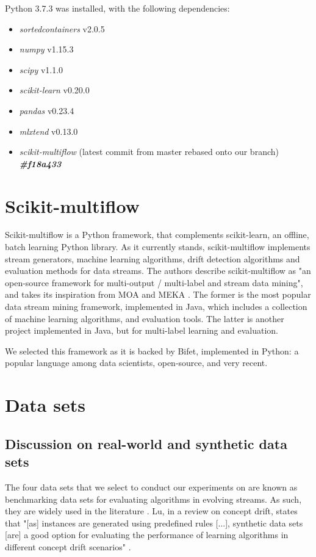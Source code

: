 Python 3.7.3 was installed, with the following dependencies:
\begin{itemize}
\item \textit{sortedcontainers} v2.0.5
\item \textit{numpy} v1.15.3
\item \textit{scipy} v1.1.0
\item \textit{scikit-learn} v0.20.0
\item \textit{pandas} v0.23.4
\item \textit{mlxtend} v0.13.0
\item \textit{scikit-multiflow} (latest commit from master rebased onto our branch) \textit{\textbf{\#f18a433}}
\end{itemize}

\section{Scikit-multiflow}
Scikit-multiflow \cite{skmultiflow} is a Python framework, that complements scikit-learn, an offline, batch learning Python library. As it currently stands, scikit-multiflow implements stream generators, machine learning algorithms, drift detection algorithms and evaluation methods for data streams. The authors describe scikit-multiflow as "an open-source framework for multi-output / multi-label and stream data mining", and takes its inspiration from MOA \cite{bifet2010moa} and MEKA \cite{read2016meka}. The former is the most popular data stream mining framework, implemented in Java, which includes a collection of machine learning algorithms, and evaluation tools. The latter is another project implemented in Java, but for multi-label learning and evaluation.

We selected this framework as it is backed by Bifet, implemented in Python: a popular language among data scientists, open-source, and very recent.

\section{Data sets\label{section:datasets}}
\subsection{Discussion on real-world and synthetic data sets}
The four data sets that we select to conduct our experiments on are known as benchmarking data sets for evaluating algorithms in evolving streams. As such, they are widely used in the literature \cite{baena2006early,bifet2007learning,gama2004learning,nishida2007detecting,olorunnimbe2015intelligent}. Lu, in a review on concept drift, states that "[as] instances are generated using predefined rules [...], synthetic data sets [are] a good option for evaluating the performance of learning algorithms in different concept drift scenarios" \cite[12-13]{lu2018learning}.

